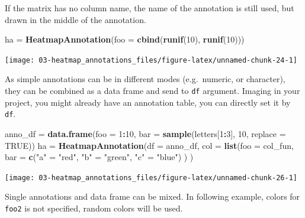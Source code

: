 \documentclass[]{book}
\newenvironment{Shaded}{\begin{snugshade}}{\end{snugshade}}
\newcommand{\KeywordTok}[1]{\textcolor[rgb]{0.13,0.29,0.53}{\textbf{#1}}}
\newcommand{\DataTypeTok}[1]{\textcolor[rgb]{0.13,0.29,0.53}{#1}}
\newcommand{\DecValTok}[1]{\textcolor[rgb]{0.00,0.00,0.81}{#1}}
\newcommand{\StringTok}[1]{\textcolor[rgb]{0.31,0.60,0.02}{#1}}
\newcommand{\OtherTok}[1]{\textcolor[rgb]{0.56,0.35,0.01}{#1}}
\newcommand{\OperatorTok}[1]{\textcolor[rgb]{0.81,0.36,0.00}{\textbf{#1}}}
\newcommand{\NormalTok}[1]{#1}
\theoremstyle{definition}
\theoremstyle{definition}
\theoremstyle{definition}
\theoremstyle{remark}
\begin{document}
If the matrix has no column name, the name of the annotation is still
used, but drawn in the middle of the annotation.

\begin{Shaded}
\begin{Highlighting}[]
\NormalTok{ha =}\StringTok{ }\KeywordTok{HeatmapAnnotation}\NormalTok{(}\DataTypeTok{foo =} \KeywordTok{cbind}\NormalTok{(}\KeywordTok{runif}\NormalTok{(}\DecValTok{10}\NormalTok{), }\KeywordTok{runif}\NormalTok{(}\DecValTok{10}\NormalTok{)))}
\end{Highlighting}
\end{Shaded}

\begin{center}\texttt{[image: 03-heatmap\_annotations\_files/figure-latex/unnamed-chunk-24-1]} \end{center}

As simple annotations can be in different modes (e.g.~numeric, or
character), they can be combined as a data frame and send to \texttt{df}
argument. Imaging in your project, you might already have an annotation
table, you can directly set it by \texttt{df}.

\begin{Shaded}
\begin{Highlighting}[]
\NormalTok{anno_df =}\StringTok{ }\KeywordTok{data.frame}\NormalTok{(}\DataTypeTok{foo =} \DecValTok{1}\OperatorTok{:}\DecValTok{10}\NormalTok{,}
    \DataTypeTok{bar =} \KeywordTok{sample}\NormalTok{(letters[}\DecValTok{1}\OperatorTok{:}\DecValTok{3}\NormalTok{], }\DecValTok{10}\NormalTok{, }\DataTypeTok{replace =} \OtherTok{TRUE}\NormalTok{))}
\NormalTok{ha =}\StringTok{ }\KeywordTok{HeatmapAnnotation}\NormalTok{(}\DataTypeTok{df =}\NormalTok{ anno_df,}
    \DataTypeTok{col =} \KeywordTok{list}\NormalTok{(}\DataTypeTok{foo =}\NormalTok{ col_fun,}
               \DataTypeTok{bar =} \KeywordTok{c}\NormalTok{(}\StringTok{"a"}\NormalTok{ =}\StringTok{ "red"}\NormalTok{, }\StringTok{"b"}\NormalTok{ =}\StringTok{ "green"}\NormalTok{, }\StringTok{"c"}\NormalTok{ =}\StringTok{ "blue"}\NormalTok{)}
\NormalTok{    )}
\NormalTok{)}
\end{Highlighting}
\end{Shaded}

\begin{center}\texttt{[image: 03-heatmap\_annotations\_files/figure-latex/unnamed-chunk-26-1]} \end{center}

Single annotations and data frame can be mixed. In following example,
colors for \texttt{foo2} is not specified, random colors will be used.
\end{document}
